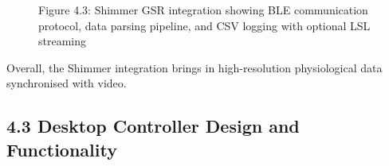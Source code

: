 \documentclass[12pt,a4paper]{article}
\begin{document}
\begin{figure}
\centering
{}
\caption{Figure 4.3: Shimmer GSR integration showing BLE communication protocol, data parsing pipeline, and CSV logging with optional LSL streaming}
\end{figure}

Overall, the Shimmer integration brings in high-resolution physiological data synchronised with video.

\subsection{4.3 Desktop Controller Design and Functionality}\label{desktop-controller-design-and-functionality}
\end{document}
